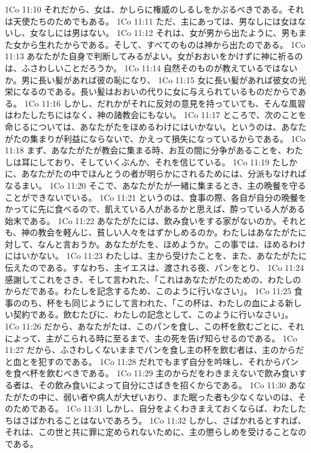 1Co 11:10  それだから、女は、かしらに権威のしるしをかぶるべきである。それは天使たちのためでもある。
1Co 11:11  ただ、主にあっては、男なしには女はないし、女なしには男はない。
1Co 11:12  それは、女が男から出たように、男もまた女から生れたからである。そして、すべてのものは神から出たのである。
1Co 11:13  あなたがた自身で判断してみるがよい。女がおおいをかけずに神に祈るのは、ふさわしいことだろうか。
1Co 11:14  自然そのものが教えているではないか。男に長い髪があれば彼の恥になり、
1Co 11:15  女に長い髪があれば彼女の光栄になるのである。長い髪はおおいの代りに女に与えられているものだからである。
1Co 11:16  しかし、だれかがそれに反対の意見を持っていても、そんな風習はわたしたちにはなく、神の諸教会にもない。
1Co 11:17  ところで、次のことを命じるについては、あなたがたをほめるわけにはいかない。というのは、あなたがたの集まりが利益にならないで、かえって損失になっているからである。
1Co 11:18  まず、あなたがたが教会に集まる時、お互の間に分争があることを、わたしは耳にしており、そしていくぶんか、それを信じている。
1Co 11:19  たしかに、あなたがたの中でほんとうの者が明らかにされるためには、分派もなければなるまい。
1Co 11:20  そこで、あなたがたが一緒に集まるとき、主の晩餐を守ることができないでいる。
1Co 11:21  というのは、食事の際、各自が自分の晩餐をかってに先に食べるので、飢えている人があるかと思えば、酔っている人がある始末である。
1Co 11:22  あなたがたには、飲み食いをする家がないのか。それとも、神の教会を軽んじ、貧しい人々をはずかしめるのか。わたしはあなたがたに対して、なんと言おうか。あなたがたを、ほめようか。この事では、ほめるわけにはいかない。
1Co 11:23  わたしは、主から受けたことを、また、あなたがたに伝えたのである。すなわち、主イエスは、渡される夜、パンをとり、
1Co 11:24  感謝してこれをさき、そして言われた、「これはあなたがたのための、わたしのからだである。わたしを記念するため、このように行いなさい」。
1Co 11:25  食事ののち、杯をも同じようにして言われた、「この杯は、わたしの血による新しい契約である。飲むたびに、わたしの記念として、このように行いなさい」。
1Co 11:26  だから、あなたがたは、このパンを食し、この杯を飲むごとに、それによって、主がこられる時に至るまで、主の死を告げ知らせるのである。
1Co 11:27  だから、ふさわしくないままでパンを食し主の杯を飲む者は、主のからだと血とを犯すのである。
1Co 11:28  だれでもまず自分を吟味し、それからパンを食べ杯を飲むべきである。
1Co 11:29  主のからだをわきまえないで飲み食いする者は、その飲み食いによって自分にさばきを招くからである。
1Co 11:30  あなたがたの中に、弱い者や病人が大ぜいおり、また眠った者も少なくないのは、そのためである。
1Co 11:31  しかし、自分をよくわきまえておくならば、わたしたちはさばかれることはないであろう。
1Co 11:32  しかし、さばかれるとすれば、それは、この世と共に罪に定められないために、主の懲らしめを受けることなのである。
